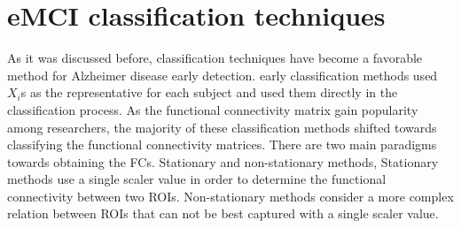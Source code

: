 \documentclass[journal]{IEEEtran}
\begin{document}
	
	
	
	
	
	
	
	\section{eMCI classification techniques}

	As it was discussed before, classification techniques have become a favorable method for Alzheimer disease early detection. early classification methods used $X_{i}$s as the representative for each subject and used them directly in the classification process. 
	As the functional connectivity matrix gain popularity among researchers, the majority of these classification methods shifted towards classifying the functional connectivity matrices. There are two main paradigms towards obtaining the FCs. Stationary and non-stationary methods, Stationary methods use a single scaler value in order to determine the functional connectivity between two ROIs. Non-stationary methods consider a more complex relation between ROIs that can not be best captured with a single scaler value. 
	    
\end{document}
